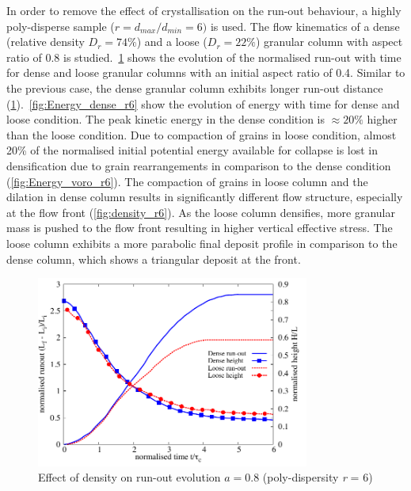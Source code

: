 In order to remove the effect of crystallisation on the run-out behaviour, a 
highly poly-disperse sample ($r = d_{max}/d_{min} = 6)$ is used. 
The flow kinematics of a dense (relative density $D_r = 74\%$) and a loose 
($D_r = 22\%$) granular column with aspect ratio of 0.8 is 
studied.~\cref{fig:runout_height_dense_r6} shows the evolution of the 
normalised run-out with time for dense and loose granular columns with an 
initial aspect ratio of 0.4. Similar to 
the previous case, the dense granular column exhibits longer run-out distance 
(\cref{fig:runout_height_dense_r6}).~\cref{fig:Energy_dense_r6} show the 
evolution of energy with time for dense and loose condition. The peak kinetic 
energy in the dense condition is $\approx 20\%$ higher than the loose 
condition. Due to compaction of grains in loose condition, almost 20\% of the 
normalised initial potential energy available for collapse is lost in 
densification due to grain rearrangements in comparison to the dense 
condition (\cref{fig:Energy_voro_r6}). The compaction of grains in loose 
column and the dilation in dense column results in significantly different flow 
structure, especially at the flow front (\cref{fig:density_r6}). As the loose 
column densifies, more granular mass is pushed to the flow front resulting in 
higher vertical effective stress. The loose column exhibits a more parabolic 
final deposit profile in comparison to the dense column, which shows a 
triangular deposit at the front.

\begin{figure}[tbhp]
\centering
\includegraphics[width=0.8\textwidth]{runout_height_dense_r6}
\caption{Effect of density on run-out evolution $a = 0.8$ (poly-dispersity 
\textit{r} = 6)}
\label{fig:runout_height_dense_r6}
\end{figure}


